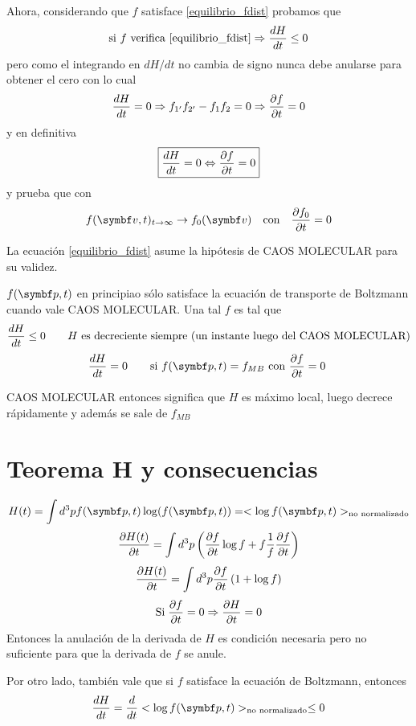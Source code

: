 \documentclass[10pt,oneside]{CBFT_book}
\begin{document}
Ahora, considerando que $f$ satisface \eqref{equilibrio_fdist} probamos que 
\[
	\text{si $f$ verifica \eqref{equilibrio_fdist}}  \Rightarrow \frac{d^{\hspace{-0.05em}} {H}}{d {t}^{\hspace{-0.05em}}} \leq 0
\]
pero como el integrando en $dH/dt$ no cambia de signo nunca debe anularse para obtener el cero
con lo cual 
\[
	\frac{d^{\hspace{-0.05em}} {H}}{d {t}^{\hspace{-0.05em}}} = 0 \Rightarrow f_{1'}f_{2'} - f_1f_2 = 0 \Rightarrow \frac{\partial^{\hspace{-0.05em}} {f}}{\partial {t}^{\hspace{-0.05em}}} = 0
\]
y en definitiva
\[
	\boxed{ \frac{d^{\hspace{-0.05em}} {H}}{d {t}^{\hspace{-0.05em}}} = 0 \Leftrightarrow  \frac{\partial^{\hspace{-0.05em}} {f}}{\partial {t}^{\hspace{-0.05em}}} = 0 }
\]
y prueba que con 
\[
	f(\vb{v},t)_{t\to \infty} \to f_0(\vb{v}) \quad \text{con} \quad \dpar{f_0}{t} = 0
\]

La ecuación \eqref{equilibrio_fdist} asume la hipótesis de CAOS MOLECULAR para su validez.

$f(\vb{p},t)$ en principiao sólo satisface la ecuación de transporte de Boltzmann cuando vale
CAOS MOLECULAR. Una tal $f$ es tal que 
\[
	\frac{d^{\hspace{-0.05em}} {H}}{d {t}^{\hspace{-0.05em}}} \leq 0 \qquad \text{$H$ es decreciente siempre (un instante luego del CAOS MOLECULAR)}
\]
\[
	\dtot{H}{t} = 0 \qquad \text{si $f(\vb{p},t) = f_{MB}$ con $\dpar{f}{t} = 0$ }
\]

CAOS MOLECULAR entonces significa que $H$ es máximo local, luego decrece rápidamente y además se sale
de $f_{MB}$

\section{Teorema H y consecuencias}

\[
	H(t) = \int d^3p f( \vb{p}, t ) \log ( f( \vb{p}, t ) ) =
	< \log f( \vb{p}, t ) >_{\text{no normalizado}}
\]
\[
	\frac{\partial^{\hspace{-0.05em}} {H(t)}}{\partial {t}^{\hspace{-0.05em}}} = \int d^3p \left( \frac{\partial^{\hspace{-0.05em}} {f}}{\partial {t}^{\hspace{-0.05em}}} \log f + f \frac{1}{f} \frac{\partial^{\hspace{-0.05em}} {f}}{\partial {t}^{\hspace{-0.05em}}} \right)
\]
\[
	\frac{\partial^{\hspace{-0.05em}} {H(t)}}{\partial {t}^{\hspace{-0.05em}}} = \int d^3p \frac{\partial^{\hspace{-0.05em}} {f}}{\partial {t}^{\hspace{-0.05em}}}  \left( 1 + \log f \right)
\]
\[
	\text{Si} \; \frac{\partial^{\hspace{-0.05em}} {f}}{\partial {t}^{\hspace{-0.05em}}} = 0 \Rightarrow \frac{\partial^{\hspace{-0.05em}} {H}}{\partial {t}^{\hspace{-0.05em}}} = 0
\]
Entonces la anulación de la derivada de $H$ es condición necesaria pero no suficiente para
que la derivada de $f$ se anule.

Por otro lado, también vale que si $f$ satisface la ecuación de Boltzmann, entonces
\[
	 \dtot{H}{t} = \dtot{}{t}< \log f( \vb{p}, t ) >_{\text{no normalizado}} \leq 0
\]
\end{document}
